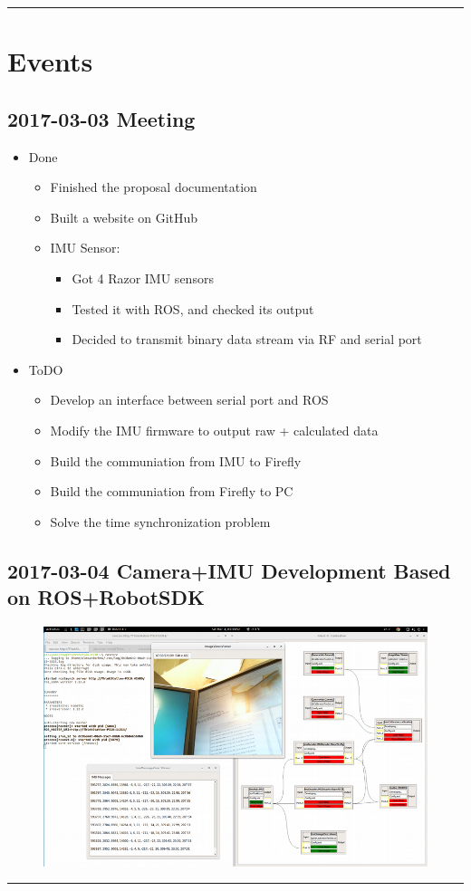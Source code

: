 \documentclass[letterpaper,12pt]{article}
\newcommand{\panhline}{\begin{center}\rule{\textwidth}{1pt}\end{center}}
\begin{document}
\panhline
\section{Events}

\subsection{2017-03-03 Meeting}

\begin{itemize}
	\item Done
	\begin{itemize}
		\item Finished the proposal documentation
		\item Built a website on GitHub
		\item IMU Sensor:
		\begin{itemize}
			\item Got 4 Razor IMU sensors
			\item Tested it with ROS, and checked its output
			\item Decided to transmit binary data stream via RF and serial port
		\end{itemize}
	\end{itemize}
	\item ToDO
	\begin{itemize}
		\item Develop an interface between serial port and ROS
		\item Modify the IMU firmware to output raw + calculated data
		\item Build the communiation from IMU to Firefly
		\item Build the communiation from Firefly to PC
		\item Solve the time synchronization problem		
	\end{itemize}
\end{itemize}

\subsection{2017-03-04 Camera+IMU Development Based on ROS+RobotSDK}

\begin{figure}[!h]
	\centering
	\includegraphics[width=20cm]{./imgs/cameraimu.png}
\end{figure}

\panhline
\end{document}
